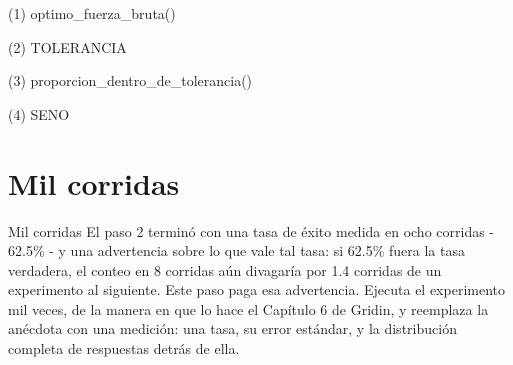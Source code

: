 \begin{frame}[fragile]{(1) optimo\_fuerza\_bruta()}

\end{frame}

\begin{frame}[fragile]{(2) TOLERANCIA}

\end{frame}

\begin{frame}[fragile]{(3) proporcion\_dentro\_de\_tolerancia()}

\end{frame}

\begin{frame}[fragile]{(4) SENO}

\end{frame}


\section{Mil corridas}

\begin{frame}{Mil corridas}
El paso 2 terminó con una tasa de éxito medida en ocho corridas - 62.5\% - y una
advertencia sobre lo que vale tal tasa: si 62.5\% fuera la tasa verdadera, el
conteo en 8 corridas aún divagaría por 1.4 corridas de un experimento al
siguiente. Este paso paga esa advertencia. Ejecuta el experimento mil
veces, de la manera en que lo hace el Capítulo 6 de Gridin, y reemplaza la anécdota con una
medición: una tasa, su error estándar, y la distribución completa de
respuestas detrás de ella.
\end{frame}

